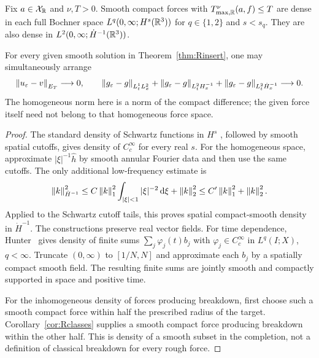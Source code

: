 \begin{proposition}\label{prop:Renergy}
Fix $a\in\mathcal X_{\mathbb R}$ and $\nu,T>0$. Smooth compact forces with $T^\nu_{\max,\mathbb R}(a,f)\le T$ are dense in each full Bochner space $L^q(0,\infty;H^s(\mathbb R^3))$ for $q\in\{1,2\}$ and $s<s_q$. They are also dense in $L^2(0,\infty;\dot H^{-1}(\mathbb R^3))$.

For every given smooth solution in Theorem~\ref{thm:Rinsert}, one may simultaneously arrange
\[
 \left\lVert u_\varepsilon-v\right\rVert_{E_T}\longrightarrow0,\qquad
 \left\lVert g_\varepsilon-g\right\rVert_{L^1_tL^2_x}
 +\left\lVert g_\varepsilon-g\right\rVert_{L^2_tH^{-1}_x}
 +\left\lVert g_\varepsilon-g\right\rVert_{L^2_t\dot H^{-1}_x}\longrightarrow0.
\]
The homogeneous norm here is a norm of the compact difference; the given force itself need not belong to that homogeneous force space.
\end{proposition}
\begin{proof}
The standard density of Schwartz functions in $H^s$
\cite[Chapter~4, Section~1, Exercise~1]{taylor2011}, followed by smooth spatial
cutoffs, gives density of $C_c^\infty$ for every real $s$. For the homogeneous
space, approximate $|\xi|^{-1}\widehat h$ by smooth annular Fourier data and
then use the same cutoffs. The only additional low-frequency estimate is
\begin{equation}\label{eq:Rnegative-cutoff}
 \left\lVert k\right\rVert_{\dot H^{-1}}^2\le
 C\left\lVert k\right\rVert_1^2\int_{|\xi|<1}|\xi|^{-2}\,\mathrm d\xi+\left\lVert k\right\rVert_2^2
 \le C'\left\lVert k\right\rVert_1^2+\left\lVert k\right\rVert_2^2.
\end{equation}
Applied to the Schwartz cutoff tails, this proves spatial compact-smooth
density in $\dot H^{-1}$. The constructions preserve real vector fields.
For time dependence, Hunter~\cite[Proposition~6.29]{hunterpde} gives density
of finite sums $\sum_j\varphi_j(t)b_j$ with $\varphi_j\in C_c^\infty$ in
$L^q(I;X)$, $q<\infty$. Truncate $(0,\infty)$ to $[1/N,N]$ and approximate
each $b_j$ by a spatially compact smooth field. The resulting finite sums
are jointly smooth and compactly supported in space and positive time.

For the inhomogeneous density of forces producing breakdown, first choose such a smooth compact force within half the prescribed radius of the target. Corollary~\ref{cor:Rclasses} supplies a smooth compact force producing breakdown within the other half. This is density of a smooth subset in the completion, not a definition of classical breakdown for every rough force.


\end{proof}
